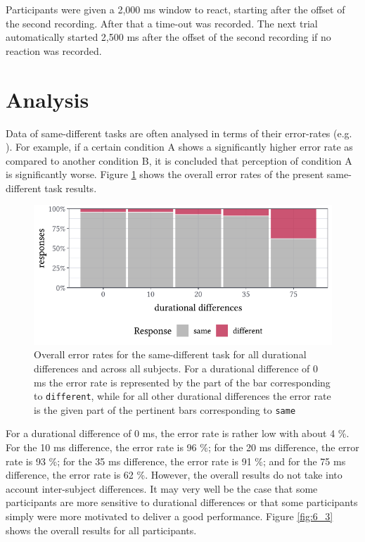 Participants were given a 2,000 ms window to react, starting after the offset of the second recording. After that a time-out was recorded. The next trial automatically started 2,500 ms after the offset of the second recording if no reaction was recorded.

\section{Analysis}\label{section06_2}

Data of same-different tasks are often analysed in terms of their error-rates (e.g. \cite{Belke2002, Norris2008errorrates, Lupker2018}). For example, if a certain condition A shows a significantly higher error rate as compared to another condition B, it is concluded that perception of condition A is significantly worse. Figure \ref{fig:6_2} shows the overall error rates of the present same-different task results.

\begin{figure}
    \centering
    \includegraphics[]{figures/fig6.2.pdf}
    \caption{Overall error rates for the same-different task for all durational differences and across all subjects. For a durational difference of 0 ms the error rate is represented by the part of the bar corresponding to \texttt{different}, while for all other durational differences the error rate is the given part of the pertinent bars corresponding to \texttt{same}}
    \label{fig:6_2}
\end{figure}

For a durational difference of 0 ms, the error rate is rather low with about 4 \%. For the 10 ms difference, the error rate is 96 \%; for the 20 ms difference, the error rate is 93 \%; for the 35 ms difference, the error rate is 91 \%; and for the 75 ms difference, the error rate is 62 \%. However, the overall results do not take into account inter-subject differences. It may very well be the case that some participants are more sensitive to durational differences or that some participants simply were more motivated to deliver a good performance. Figure \ref{fig:6_3} shows the overall results for all participants. 

